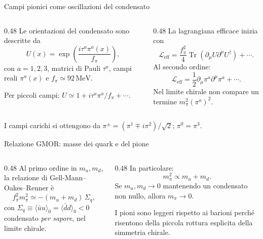 \begin{frame}{Campi pionici come oscillazioni del condensato}
\small
\begin{columns}[T,onlytextwidth]
\begin{column}{0.48\textwidth}
Le orientazioni del condensato sono descritte da
\[
 U(x)=\exp\!\left(\frac{i\tau^a\pi^a(x)}{f_\pi}\right),
\]
con $a=1,2,3$, matrici di Pauli $\tau^a$, campi reali $\pi^a(x)$ e $f_\pi\simeq92\,\mathrm{MeV}$.

Per piccoli campi: $U\simeq1+i\tau^a\pi^a/f_\pi+\cdots$.
\end{column}
\begin{column}{0.48\textwidth}
La lagrangiana efficace inizia con
\[
 \mathcal L_{\mathrm{eff}}=\frac{f_\pi^2}{4}
 \operatorname{Tr}(\partial_\mu U\partial^\mu U^\dagger)+\cdots.
\]
Al secondo ordine:
\[
 \mathcal L_{\mathrm{eff}}=\frac12\partial_\mu\pi^a\partial^\mu\pi^a+\cdots.
\]
Nel limite chirale non compare un termine $m_\pi^2(\pi^a)^2$.
\end{column}
\end{columns}
\medskip
I campi carichi si ottengono da $\pi^\pm=(\pi^1\mp i\pi^2)/\sqrt2$; $\pi^0=\pi^3$.
\end{frame}

\begin{frame}{Relazione GMOR: masse dei quark e del pione}
\small
\begin{columns}[T,onlytextwidth]
\begin{column}{0.48\textwidth}
Al primo ordine in $m_u,m_d$, la relazione di Gell-Mann--Oakes--Renner è
\[
 f_\pi^2m_\pi^2\simeq
 -(m_u+m_d)\,\Sigma_q,
\]
con $\Sigma_q\equiv\langle\bar u u\rangle_0
 =\langle\bar d d\rangle_0<0$ condensato \emph{per sapore}, nel limite chirale.
\end{column}
\begin{column}{0.48\textwidth}
In particolare:
\[
 m_\pi^2\propto m_u+m_d.
\]
Se $m_u,m_d\to0$ mantenendo un condensato non nullo, allora $m_\pi\to0$.

I pioni sono leggeri rispetto ai barioni perché risentono della piccola rottura esplicita della simmetria chirale.
\end{column}
\end{columns}
\end{frame}

